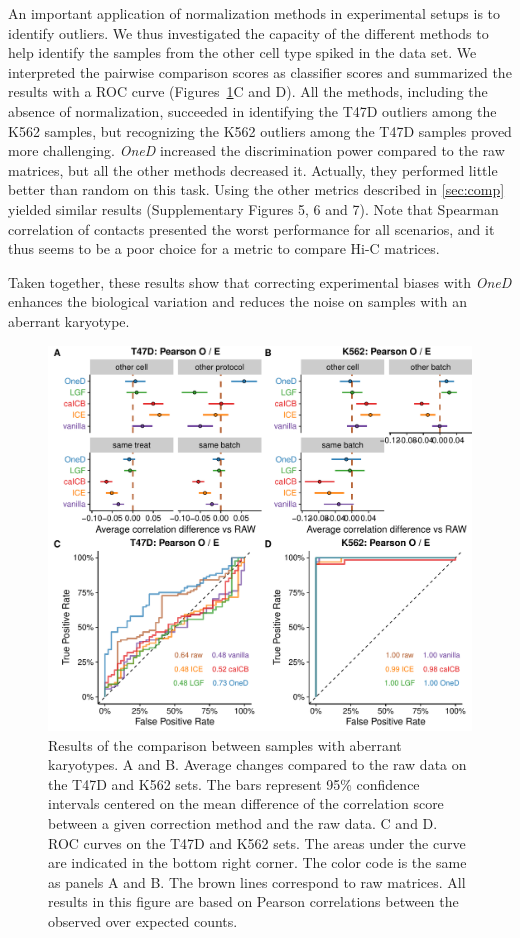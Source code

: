 \documentclass{article}
\begin{document}
An important application of normalization methods in experimental setups
is to identify outliers. We thus investigated the capacity of the
different methods to help identify the samples from the other cell type
spiked in the data set. We interpreted the pairwise comparison scores as
classifier scores and summarized the results with a ROC curve
(Figures~\ref{fig:aberrant}C and D). All the methods, including the
absence of normalization, succeeded in identifying the T47D outliers among
the K562 samples, but recognizing the K562 outliers among the T47D samples
proved more challenging. \textit{OneD} increased the discrimination power
compared to the raw matrices, but all the other methods decreased it.
Actually, they performed little better than random on this task. Using the
other metrics described in \ref{sec:comp} yielded similar results
(Supplementary Figures 5, 6 and 7). Note that Spearman correlation of
contacts presented the worst performance for all scenarios, and it thus
seems to be a poor choice for a metric to compare Hi-C matrices.

Taken together, these results show that correcting experimental biases
with \textit{OneD} enhances the biological variation and reduces the noise
on samples with an aberrant karyotype.


\begin{figure}
\centerline{\includegraphics[width=.99\textwidth]
  {img/correlation_aberrant_figure3.pdf}}
\caption{
Results of the comparison between samples with aberrant karyotypes. A and
B. Average changes compared to the raw data on the T47D and K562 sets. The
bars represent 95\% confidence intervals centered on the mean difference
of the correlation score between a given correction method and the raw
data. C and D. ROC curves on the T47D and K562 sets.  The areas under the
curve are indicated in the bottom right corner. The color code is the same
as panels A and B. The brown lines correspond to raw matrices. All results
in this figure are based on Pearson correlations between the observed over
expected counts.}
\label{fig:aberrant}
\end{figure}
\end{document}
